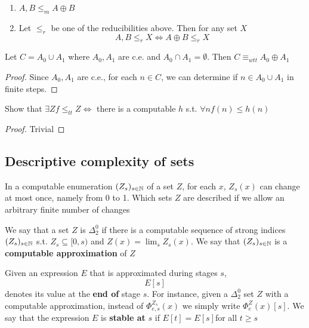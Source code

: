\documentclass[11pt]{article}
\begin{document}
\begin{exercise}
\label{1.2.23}
\begin{enumerate}
\item \(A,B\le_mA\oplus B\)
\item Let \(\le_r\) be one of the reducibilities above. Then for any set \(X\)
\begin{equation*}
A,B\le_rX\Leftrightarrow A\oplus B\le_rX
\end{equation*}
\end{enumerate}
\end{exercise}

\begin{exercise}
\label{1.2.24}
Let \(C=A_0\cup A_1\) where \(A_0,A_1\) are c.e. and \(A_0\cap A_1=\emptyset\). Then \(C\equiv_{wtt}A_0\oplus A_1\)
\end{exercise}

\begin{proof}
Since \(A_0,A_1\) are c.e., for each \(n\in C\), we can determine if \(n\in A_0\cup A_1\) in finite steps.
\end{proof}

\begin{exercise}
\label{1.2.25}
Show that \(\exists Zf\le_{tt}Z\Leftrightarrow\) there is a computable \(h\) s.t. \(\forall nf(n)\le h(n)\)
\end{exercise}

\begin{proof}
Trivial
\end{proof}
\subsection{Descriptive complexity of sets}
\label{sec:org997113d}
In a computable enumeration \((Z_s)_{s\in\mathbb{N}}\) of a set \(Z\), for each \(x\), \(Z_s(x)\) can
change at most once, namely from 0 to 1. Which sets \(Z\) are described if we allow an arbitrary
finite number of changes


\begin{definition}[]
We say that a set \(Z\) is \(\Delta_2^0\) if there is a computable sequence of strong
indices \((Z_s)_{s\in\mathbb{N}}\) s.t. \(Z_s\subseteq[0,s)\) and \(Z(x)=\lim_sZ_s(x)\). We say
that \((Z_s)_{s\in\mathbb{N}}\) is a \textbf{computable approximation} of \(Z\)
\end{definition}

Given an expression \(E\) that is approximated during stages \(s\),
\begin{equation*}
E[s]
\end{equation*}
denotes its value at the \textbf{end of} stage \(s\). For instance, given a \(\Delta_2^0\) set \(Z\) with a
computable approximation, instead of \(\Phi_{e,s}^{Z_s}(x)\) we simply write \(\Phi_e^Z(x)[s]\). We say
that the expression \(E\) is \textbf{stable at} \(s\) if \(E[t]=E[s]\)for all \(t\ge s\)
\end{document}
